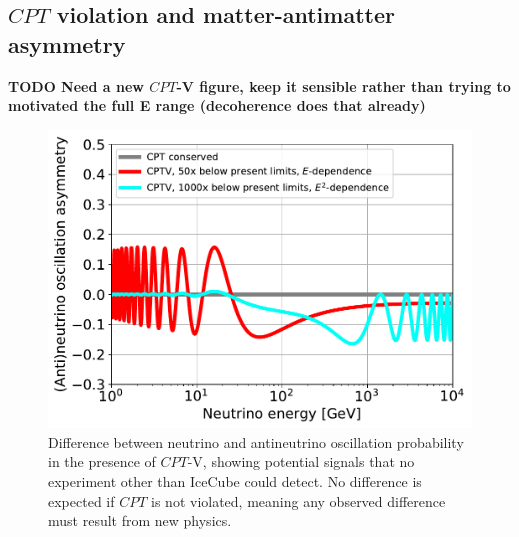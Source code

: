 \documentclass[a4paper,11pt]{article}
\begin{document}


\subsection{$CPT$ violation and matter-antimatter asymmetry}

\textbf{TODO Need a new $CPT$-V figure, keep it sensible rather than trying to motivated the full E range (decoherence does that already)}

\begin{figure} %
    \centering
    \includegraphics[trim=0.0cm 0.0cm 0.cm 0.0cm, clip=true, width=1.\linewidth]{images/CPTv_IceCube.pdf}
	\caption{Difference between neutrino and antineutrino oscillation probability in the presence of $CPT$-V, showing potential signals that no experiment other than IceCube could detect. No difference is expected if $CPT$ is not violated, meaning any observed difference must result from new physics. }
	\label{fig:$CPT$v}
\end{figure}
\end{document}

